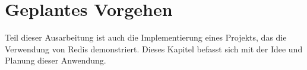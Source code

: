 
\chapter{Geplantes Vorgehen}

Teil dieser Ausarbeitung ist auch die Implementierung eines Projekts, das die Verwendung von \ac{Redis} demonstriert. Dieses Kapitel befasst sich mit der Idee und Planung dieser Anwendung. 